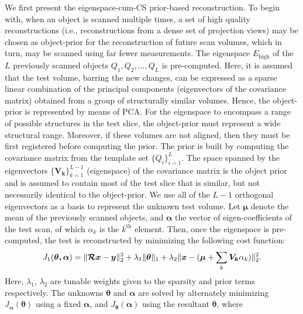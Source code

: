 \documentclass[journal]{IEEEtran}
\begin{document}
We first present the eigenspace-cum-CS prior-based reconstruction. To begin with, when an object is scanned multiple times, a set of high quality reconstructions (i.e., reconstructions from a dense set of projection views) may be chosen as object-prior for the reconstruction of future scan volumes, which in turn, may be scanned using far fewer measurements. The eigenspace $E_{\text{high}}$ of the $L$ previously scanned objects $Q_1,Q_2,...,Q_L$ is pre-computed. Here, it is assumed that the test volume, barring the new changes, can be expressed as a sparse linear combination of the principal components (eigenvectors of the covariance matrix) obtained from a group of structurally similar volumes. Hence, the object-prior is represented by means of PCA. For the eigenspace to encompass a range of possible structures in the test slice, the object-prior must represent a wide structural range. Moreover, if these volumes are not aligned, then they must be first registered before computing the prior. The prior is built by computing the covariance matrix from the template set $\{Q_i\}_{i=1}^L$. The space spanned by the eigenvectors $\{\boldsymbol{V_k}\}_{k=1}^{L-1}$ (eigenspace) of the covariance matrix is the object prior and is assumed to contain most of the test slice that is similar, but not necessarily identical to the object-prior. We use all of the $L-1$ orthogonal eigenvectors as a basis to represent the unknown test volume. Let $\boldsymbol{\mu}$ denote the mean of the previously scanned objects, and $\boldsymbol{\alpha}$ the vector of eigen-coefficients of the test scan, of which $\alpha_k$ is the $k^{\textrm{th}}$ element. Then, once the eigenspace is pre-computed, the test is reconstructed by minimizing the following cost function:
\vspace{4mm}
 \begin{equation}
   \setlength{\belowdisplayskip}{0pt} \setlength{\belowdisplayshortskip}{0pt}
\setlength{\abovedisplayskip}{-2pt} \setlength{\abovedisplayshortskip}{-2pt}
J_1(\boldsymbol{\theta,\alpha}) = \lVert\boldsymbol{\mathcal{R} x}- \boldsymbol{y}\rVert_2^2  + \lambda_1\lVert\boldsymbol{\theta}\rVert_1+\lambda_2\lVert\boldsymbol{x} - (\boldsymbol{\mu} + \sum_{k}\boldsymbol{V_k}\alpha_k)\rVert_2^2.
\label{Eq:main_prior}
\end{equation}
Here, $\lambda_1$, $\lambda_2$ are tunable weights given to the sparsity and prior terms respectively. The unknowns $\boldsymbol{\theta}$ and $\boldsymbol{\alpha}$
are solved by alternately minimizing $J_{\boldsymbol{\alpha}}(\boldsymbol{\theta})$ using a fixed $\boldsymbol{\alpha}$, and $J_{\boldsymbol\theta}(\boldsymbol{\alpha})$ using the resultant $\boldsymbol{\theta}$, where 
\end{document}

